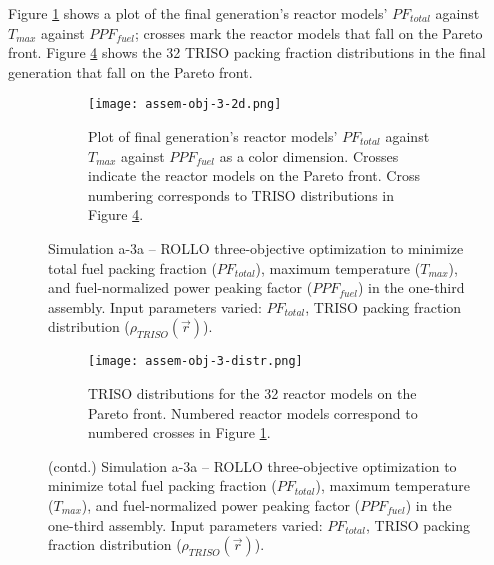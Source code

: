 Figure \ref{fig:assem-obj-3-2d} shows a plot of the final generation's reactor models' 
$PF_{total}$ against $T_{max}$ against $PPF_{fuel}$; crosses mark the reactor models 
that fall on the Pareto front.
Figure \ref{fig:assem-obj-3-distr} shows the 32 TRISO packing fraction distributions in 
the final generation that fall on the Pareto front. 
\begin{figure}[htbp!]
    \begin{subfigure}{\textwidth}
        \centering
        \texttt{[image: assem-obj-3-2d.png]}
        \caption{Plot of final generation's reactor models' $PF_{total}$ against 
        $T_{max}$ against $PPF_{fuel}$ as a color dimension. 
        Crosses indicate the reactor models on the 
        Pareto front. Cross numbering corresponds to TRISO distributions in Figure 
        \ref{fig:assem-obj-3-distr}.}
        \label{fig:assem-obj-3-2d} 
    \end{subfigure}
    \caption{Simulation a-3a -- ROLLO three-objective optimization to minimize total 
    fuel packing fraction ($PF_{total}$), maximum temperature ($T_{max}$), and 
    fuel-normalized power peaking factor ($PPF_{fuel}$) in the one-third assembly. 
    Input parameters varied: $PF_{total}$, TRISO packing fraction distribution
    ($\rho_{TRISO}(\vec{r})$).}
    \label{fig:assem-obj-3}
\end{figure}
\begin{figure}[htbp!]
    \ContinuedFloat
    \begin{subfigure}{\textwidth}
        \centering
        \texttt{[image: assem-obj-3-distr.png]}
        \caption{TRISO distributions for the 32 reactor models on the Pareto front.
        Numbered reactor models correspond to numbered crosses in Figure 
        \ref{fig:assem-obj-3-2d}. }
        \label{fig:assem-obj-3-distr} 
    \end{subfigure}
    \caption{(contd.) Simulation a-3a -- ROLLO three-objective optimization to minimize 
    total fuel packing fraction ($PF_{total}$), maximum temperature ($T_{max}$),
    and fuel-normalized power peaking factor ($PPF_{fuel}$) in the one-third assembly. 
    Input parameters varied: $PF_{total}$, TRISO packing fraction distribution
    ($\rho_{TRISO}(\vec{r})$).}
\end{figure}

